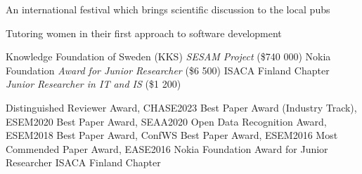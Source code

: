 \documentclass[9pt]{article}
\begin{document}
\bigskip
{}

 
\newline\noindent An international festival which brings scientific discussion to the local pubs\bigskip
\bigskip

 
\newline\noindent Tutoring women in their first approach to software development\bigskip
\bigskip

\noindent Knowledge Foundation of Sweden (KKS) \textit{SESAM Project} (\$740 000)  
\newline\noindent Nokia Foundation \textit{Award for Junior Researcher} (\$6 500)
\newline\noindent ISACA Finland Chapter \textit{Junior Researcher in IT and IS} (\$1 200)
\bigskip

\noindent Distinguished Reviewer Award, CHASE2023 
\newline\noindent Best Paper Award (Industry Track), ESEM2020 
\newline\noindent Best Paper Award, SEAA2020 
\newline\noindent Open Data Recognition Award, ESEM2018 
\newline\noindent Best Paper Award, ConfWS 
\newline\noindent Best Paper Award, ESEM2016 
\newline\noindent Most Commended Paper Award, EASE2016 
\newline\noindent Nokia Foundation Award for Junior Researcher 
\newline\noindent ISACA Finland Chapter
\bigskip


{}

\vspace{-0.02in}
 
\newline{}

\medskip
{} 
\newline{}
\end{document}
